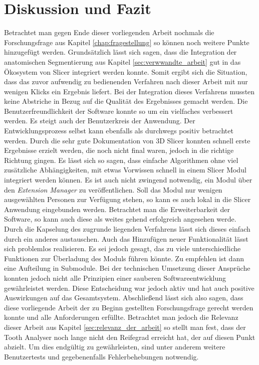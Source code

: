 \chapter{Diskussion und Fazit}
\label{chap:diskussion} Betrachtet man gegen Ende dieser vorliegenden Arbeit nochmals
die Forschungsfrage aus Kapitel \ref{chap:fragestellung} so können noch weitere Punkte
hinzugefügt werden. Grundsätzlich lässt sich sagen, dass die Integration der anatomischen
Segmentierung aus Kapitel \ref{sec:verwwandte_arbeit} gut in das Ökosystem von Slicer
integriert werden konnte. Somit ergibt sich die Situation, dass das zuvor aufwendig
zu bedienenden Verfahren nach dieser Arbeit mit nur wenigen Klicks ein Ergebnis liefert.
Bei der Integration dieses Verfahrens mussten keine Abstriche in Bezug auf die
Qualität des Ergebnisses gemacht werden. Die Benutzerfreundlichkeit der Software
konnte so um ein vielfaches verbessert werden. Es steigt auch der Benutzerkreis
der Anwendung. Der Entwicklungsprozess selbst kann ebenfalls als durchwegs positiv
betrachtet werden. Durch die sehr gute Dokumentation von 3D Slicer konnten
schnell erste Ergebnisse erzielt werden, die noch nicht final waren, jedoch in
die richtige Richtung gingen. Es lässt sich so sagen, dass einfache Algorithmen
ohne viel zusätzliche Abhängigkeiten, mit etwas Vorwissen schnell in einem Slicer
Modul integriert werden können. Es ist auch nicht zwingend notwendig, ein Modul über
den \textit{Extension Manager} zu veröffentlichen. Soll das Modul nur wenigen ausgewählten
Personen zur Verfügung stehen, so kann es auch lokal in die Slicer Anwendung
eingebunden werden. Betrachtet man die Erweiterbarkeit der Software, so kann
auch diese als weites gehend erfolgreich angesehen werde. Durch die Kapselung des
zugrunde liegenden Verfahrens lässt sich dieses einfach durch ein anderes austauschen.
Auch das Hinzufügen neuer Funktionalität lässt sich problemlos realisieren. Es sei
jedoch gesagt, das zu viele unterschiedliche Funktionen zur Überladung des
Moduls führen könnte. Zu empfehlen ist dann eine Aufteilung in Submodule. Bei
der technischen Umsetzung dieser Ansprüche konnten jedoch nicht alle Prinzipien
einer sauberen Softwareentwicklung gewährleistet werden. Diese Entscheidung war jedoch
aktiv und hat auch positive Auswirkungen auf das Gesamtsystem. Abschließend
lässt sich also sagen, dass diese vorliegende Arbeit der zu Beginn gestellten Forschungsfrage
gerecht werden konnte und alle Anforderungen erfüllte. Betrachtet man jedoch die
Relevanz dieser Arbeit aus Kapitel \ref{sec:relevanz_der_arbeit} so stellt man
fest, dass der Tooth Analyser noch lange nicht den Reifegrad erreicht hat, der
auf diesen Punkt abzielt. Um dies endgültig zu gewährleisten, sind unter anderem
weitere Benutzertests und gegebenenfalls Fehlerbehebungen notwendig.
